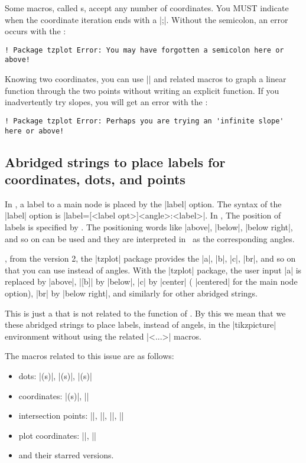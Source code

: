 Some macros, called s, accept any number of coordinates. You MUST indicate when the coordinate iteration ends with a  |;|. Without the semicolon, an error occurs with the :
\begin{verbatim}
! Package tzplot Error: You may have forgotten a semicolon here or above!
\end{verbatim}

Knowing two coordinates, you can use |\tzLFn| and related macros to graph a linear function through the two points without writing an explicit function.
If you inadvertently try  slopes, you will get an error with the :
\begin{verbatim}
! Package tzplot Error: Perhaps you are trying an 'infinite slope' here or above!
\end{verbatim}

\subsection{Abridged strings to place labels for coordinates, dots, and points}
\label{ss:string-replacement}

In \Tikz, a label to a main node is placed by the |label| option. The syntax of the |label| option is |label={[<label opt>]<angle>:{<label>}}|.
In \Tikz, The position of labels is specified by . The positioning words like |above|, |below|, |below right|, and so on can be used and they are interpreted in \Tikz\ as the corresponding angles.

, from the version 2, the |tzplot| package provides the  |a|, |b|, |c|, |br|, and so on that you can use instead of angles. With the |tzplot| package, the user input |a| is replaced by |above|, |[b]| by |below|, |c| by |center| ( |centered| for the main node option), |br| by |below right|, and similarly for other abridged strings.

\remark This is just a  that is not related to the function of \Tikz. By this we mean that we  these abridged strings to place labels, instead of angels, in the |tikzpicture| environment without using the related |\tz<...>| macros.

The macros related to this issue are as follows:

\begin{itemize}%
\item dots: |\tzdot(s)|, |\tzcdots(s)|, |\tznodedot(s)|
\item coordinates: |\tzcoor(s)|, |\tzcoorsquick|
\item intersection points: |\tzXpoint|, |\tzvXpoint|, |\tzhXpoint|, |\tzLFnXpoint|
\item plot coordinates: |\tzplot|, |\tzplotcurve|
\item and their starred versions.
\end{itemize}

